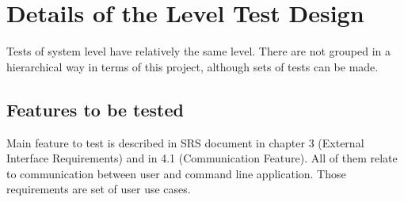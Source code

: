 \chapter{Details of the Level Test Design} \label{chp:details-of-the-level-test-design}
	\begin{comment}
		Introduce the following subordinate sections. This section describes the features to be tested and any
		refinements to the test approach as required for the level. It also identifies the sets of test cases (highest
		level test cases) or scenarios along with the pass/fail criteria. It may also include the test deliverables.
	\end{comment}
	Tests of system level have relatively the same level. There are not grouped in a hierarchical way in terms of this project, although sets of tests can be made.
\section{Features to be tested} \label{s:details-of-the-level-test-design:features-to-be-tested}
	\begin{comment}
		Identify the test items and describe the features and combinations of features that are the object of this
		LTD. Other features that may be exercised but that are not the specific object of this LTD need not be
		identified (e.g., a database management system that is supporting the reports that are being tested). The
		LTD provides more detailed information than the Level Test Plan. For example, identify an overall test
		architecture of all test scenarios, the individual scenarios, and the detailed test objectives within each
		scenario.
		For each feature or feature combination, a reference to its associated requirements in the item
		requirement and/or design description may be included. This may be documented in a Test
		Traceability Matrix (LTP Section 2.2).
	\end{comment}
	Main feature to test is described in \gls{SRS} document in chapter 3 (External Interface Requirements) and in 4.1 (Communication Feature). All of them relate to communication between user and command line application. Those requirements are set of user use cases.
